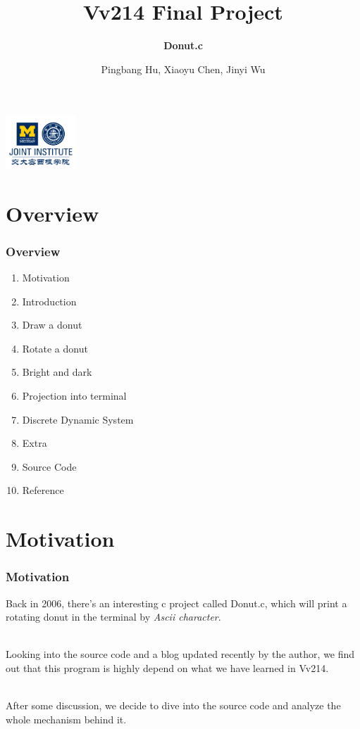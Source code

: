 \documentclass[12pt, t]{beamer}
\title{Vv214 Final Project}
\subtitle{\textbf{Donut.c}}
\institute[UM-SJTU JI]{University of Michigan-Shanghai Jiao Tong University Joint Institute}
\author{Pingbang Hu, Xiaoyu Chen, Jinyi Wu}
\renewcommand{\emph}[1]{{\color{Turquoise3}\textsl{#1}}}
\newcommand{\nullspace}{~\\[15pt]}
\begin{document}
\begin{frame}
    \titlepage
    \begin{center}
        \includegraphics[height=2cm]{Figures/logo/logo2.png}
    \end{center}
\end{frame}

\section{Overview}
    \begin{frame}
        \frametitle{Overview}
        \begin{enumerate}
            \item Motivation
            \item Introduction
            \item Draw a donut
            \item Rotate a donut
            \item Bright and dark
            \item Projection into terminal
            \item Discrete Dynamic System
            \item Extra
            \item Source Code
            \item Reference
        \end{enumerate}
    \end{frame}


\section{Motivation}
\begin{frame}
    \frametitle{Motivation}

    Back in 2006, there's an interesting c project called Donut.c, which will print a rotating 
    donut in the terminal by \emph{Ascii character}.

    \nullspace
    Looking into the source code and a blog updated recently by the author, we find out 
    that this program is highly depend on what we have learned in Vv214.

    \nullspace
    After some discussion, we decide to dive into the source code and analyze the whole mechanism 
    behind it.

\end{frame}
\end{document}
